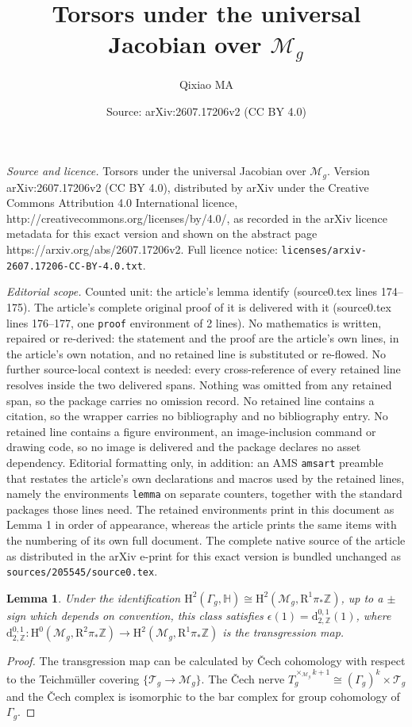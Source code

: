 \documentclass[10pt,a4paper]{amsart}
\title{Torsors under the universal Jacobian over $\mathcal{M}_g$}
\author{Qixiao MA}
\date{Source: arXiv:2607.17206v2 (CC BY 4.0)}
\newtheorem{lemma}{Lemma}
\begin{document}
\maketitle

\noindent\emph{Source and licence.} Torsors under the universal Jacobian over $\mathcal{M}_g$. Version arXiv:2607.17206v2 (CC BY 4.0), distributed by arXiv under the Creative Commons Attribution 4.0 International licence, http://creativecommons.org/licenses/by/4.0/, as recorded in the arXiv licence metadata for this exact version and shown on the abstract page https://arxiv.org/abs/2607.17206v2. Full licence notice: \texttt{licenses/arxiv-2607.17206-CC-BY-4.0.txt}.\par\smallskip

\noindent\textit{Editorial scope.} Counted unit: the article's lemma identify (source0.tex lines 174--175). The article's complete original proof of it is delivered with it (source0.tex lines 176--177, one \texttt{proof} environment of 2 lines). No mathematics is written, repaired or re-derived: the statement and the proof are the article's own lines, in the article's own notation, and no retained line is substituted or re-flowed.  No further source-local context is needed: every cross-reference of every retained line resolves inside the two delivered spans.  Nothing was omitted from any retained span, so the package carries no omission record.  No retained line contains a citation, so the wrapper carries no bibliography and no bibliography entry.  No retained line contains a figure environment, an image-inclusion command or drawing code, so no image is delivered and the package declares no asset dependency.  Editorial formatting only, in addition: an AMS \texttt{amsart} preamble that restates the article's own declarations and macros used by the retained lines, namely the environments \texttt{lemma} on separate counters, together with the standard packages those lines need.  The retained environments print in this document as Lemma 1 in order of appearance, whereas the article prints the same items with the numbering of its own full document.  The complete native source of the article as distributed in the arXiv e-print for this exact version is bundled unchanged as \texttt{sources/205545/source0.tex}.
\begin{lemma}\label{identify}Under the identification $\mathrm{H}^2(\Gamma_g,\mathbb{H})\cong\mathrm{H}^2(\mathcal{M}_g,\mathrm{R}^1\pi_*\mathbb{Z})$, up to a $\pm$ sign which depends on convention, this class satisfies $\epsilon(1)=\mathrm{d}_{2,\mathbb{Z}}^{0,1}(1)$, where $\mathrm{d}_{2,\mathbb{Z}}^{0,1}\colon\mathrm{H}^0(\mathcal{M}_g,\mathrm{R}^2\pi_*\mathbb{Z})\to\mathrm{H}^2(\mathcal{M}_g,\mathrm{R}^1\pi_*\mathbb{Z})$ is the transgression map.
\end{lemma}

\begin{proof}The transgression map can be calculated by \v{C}ech cohomology with respect to the Teichm\"uller covering $\{\mathcal{T}_{g}\to\mathcal{M}_{g}\}$. The \v{C}ech nerve $T_{g}^{\times_{\mathcal{M}_g}k+1}\cong(\Gamma_g)^k\times\mathcal{T}_g$ and the \v{C}ech complex is isomorphic to the bar complex for group cohomology of $\Gamma_g$.
\end{proof}
\end{document}
